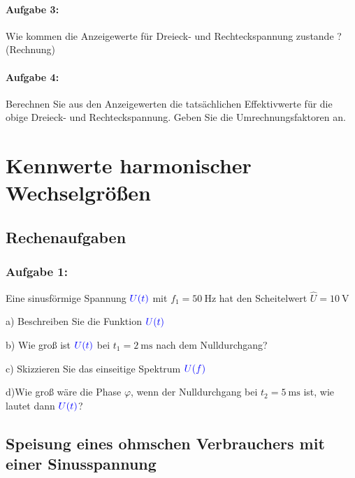 \documentclass[11pt,a4paper,titlepage,parskip=half]{scrreprt}
\begin{document}
		
            \subsubsection{Aufgabe 3:} Wie kommen die Anzeigewerte für Dreieck- und Rechteckspannung zustande ?   (Rechnung)\\
            
            \subsubsection{Aufgabe 4:} Berechnen Sie aus den Anzeigewerten die tatsächlichen Effektivwerte für die   obige Dreieck- und Rechteckspannung. Geben Sie die Umrechnungsfaktoren an.
            
    \chapter{Kennwerte harmonischer Wechselgrößen}
     
        \section{Rechenaufgaben}
            \subsection{Aufgabe 1:}
                 Eine sinusförmige Spannung $\textcolor{blue}{U(t)}$ mit $f_1 = \SI{50}{\hertz}$ hat den Scheitelwert $\hat{U} = \SI{10}{\volt}$
                 
                 a) Beschreiben Sie die Funktion $\textcolor{blue}{U(t)}$
                 
                 b) Wie groß ist  $\textcolor{blue}{U(t)}$ bei $t_1 = \SI{2}{\milli\second}$ nach dem Nulldurchgang?
                 
                 c) Skizzieren Sie das einseitige Spektrum $\textcolor{blue}{U(f)}$
                 
                 d)Wie groß wäre die Phase $\varphi$, wenn der Nulldurchgang bei $t_2 = \SI{5}{\milli\second}$ ist, wie lautet dann $\textcolor{blue}{U(t)}$? 
               
                
        \section{Speisung eines ohmschen Verbrauchers mit einer Sinusspannung}
\end{document}
